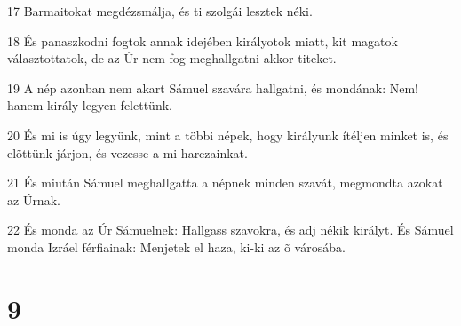 \par 17 Barmaitokat megdézsmálja, és ti szolgái lesztek néki.
\par 18 És panaszkodni fogtok annak idejében királyotok miatt, kit magatok választottatok, de az Úr nem fog meghallgatni akkor titeket.
\par 19 A nép azonban nem akart Sámuel szavára hallgatni, és mondának: Nem! hanem király legyen felettünk.
\par 20 És mi is úgy legyünk, mint a többi népek, hogy királyunk ítéljen minket is, és elõttünk járjon, és vezesse a mi harczainkat.
\par 21 És miután Sámuel meghallgatta a népnek minden szavát, megmondta azokat az Úrnak.
\par 22 És monda az Úr Sámuelnek: Hallgass szavokra, és adj nékik királyt. És Sámuel monda Izráel férfiainak: Menjetek el haza, ki-ki az õ városába.

\chapter{9}

